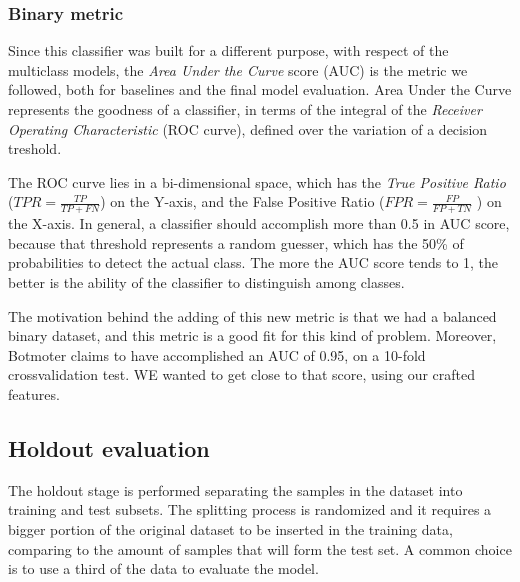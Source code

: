 \subsubsection{Binary metric}
Since this classifier was built for a different purpose, with respect of the multiclass models, the \textit{Area Under the Curve} score (AUC) is the metric we followed, both for baselines and the final model evaluation.
Area Under the Curve represents the goodness of a classifier, in terms of the integral of the \textit{Receiver Operating Characteristic} (ROC curve), defined over the variation of a decision treshold.

The ROC curve lies in a bi-dimensional space, which has the \textit{True Positive Ratio} ($ TPR =  \frac{TP}{TP+FN}$) on the Y-axis, and the False Positive Ratio ($ FPR =  \frac{FP}{FP+TN}$ ) on the X-axis.
In general, a classifier should accomplish more than 0.5 in AUC score, because that threshold represents a random guesser, which has the 50\% of probabilities to detect the actual class.
The more the AUC score tends to 1, the better is the ability of the classifier to distinguish among classes.

The motivation behind the adding of this new metric is that we had a balanced binary dataset, and this metric is a good fit for this kind of problem. Moreover, Botmoter claims to have accomplished an AUC of 0.95, on a 10-fold crossvalidation test.
WE wanted to get close to that score, using our crafted features.


\subsection{Holdout evaluation}
The holdout stage is performed separating the samples in the dataset into training and test subsets. The splitting process is randomized and it requires a bigger portion of the original dataset to be inserted in the training data, comparing to the amount of samples that will form the test set. A common choice is to use a third of the data to evaluate the model.

